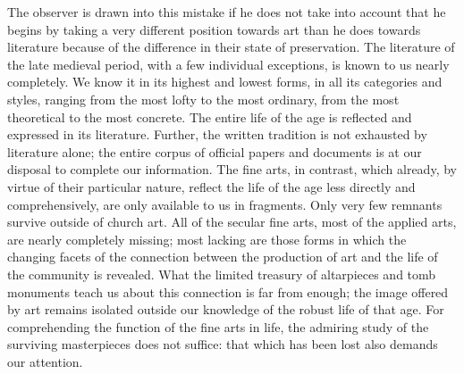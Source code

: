The observer is drawn into this mistake if he does not take into account
that he begins by taking a very different position towards art than he
does towards literature because of the difference in their state of
preservation. The literature of the late medieval period, with a few
individual exceptions, is known to us nearly completely. We know it in
its highest and lowest forms, in all its categories and styles, ranging
from the most lofty to the most ordinary, from the most theoretical to
the most concrete. The entire life of the age is reflected and expressed
in its literature. Further, the written
\protect\hypertarget{19_Chapter_Twelve__ART_IN_LIFE.xhtmlux5cux23page_296}{}{}tradition
is not exhausted by literature alone; the entire corpus of official
papers and documents is at our disposal to complete our information. The
fine arts, in contrast, which already, by virtue of their particular
nature, reflect the life of the age less directly and comprehensively,
are only available to us in fragments. Only very few remnants survive
outside of church art. All of the secular fine arts, most of the applied
arts, are nearly completely missing; most lacking are those forms in
which the changing facets of the connection between the production of
art and the life of the community is revealed. What the limited treasury
of altarpieces and tomb monuments teach us about this connection is far
from enough; the image offered by art remains isolated outside our
knowledge of the robust life of that age. For comprehending the function
of the fine arts in life, the admiring study of the surviving
masterpieces does not suffice: that which has been lost also demands our
attention.

